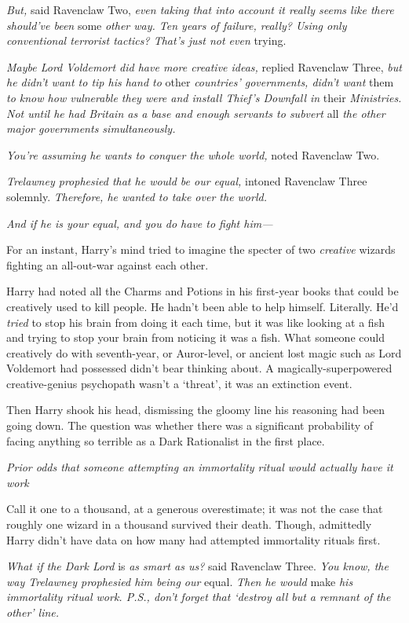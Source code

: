 \emph{But,} said Ravenclaw Two, \emph{even taking that into account{\el} it
really seems like there should've been} some \emph{other way. Ten years of
failure, really? Using only conventional terrorist tactics? That's just{\el}
not even} trying.

\emph{Maybe Lord Voldemort did have more creative ideas,} replied Ravenclaw
Three, \emph{but he didn't want to tip his hand to} other \emph{countries'
governments, didn't want} them \emph{to know how vulnerable they were and
install Thief's Downfall in} their \emph{Ministries. Not until he had Britain
as a base and enough servants to subvert} all \emph{the other major governments
simultaneously.}

\emph{You're assuming he wants to conquer the whole world,} noted Ravenclaw Two.

\emph{Trelawney prophesied that he would be our equal,} intoned Ravenclaw
Three solemnly. \emph{Therefore, he wanted to take over the world.}

\emph{And if he is your equal, and you do have to fight him—}

For an instant, Harry's mind tried to imagine the specter of two
\emph{creative} wizards fighting an all-out-war against each other.

Harry had noted all the Charms and Potions in his first-year books that could
be creatively used to kill people. He hadn't been able to help himself.
Literally. He'd \emph{tried} to stop his brain from doing it each time, but it
was like looking at a fish and trying to stop your brain from noticing it was a
fish. What someone could creatively do with seventh-year, or Auror-level, or
ancient lost magic such as Lord Voldemort had possessed{\el} didn't bear
thinking about. A magically-superpowered creative-genius psychopath wasn't a
`threat', it was an extinction event.

Then Harry shook his head, dismissing the gloomy line his reasoning had been
going down. The question was whether there was a significant probability of
facing anything so terrible as a Dark Rationalist in the first place.

\emph{Prior odds that someone attempting an immortality ritual would actually
have it work{\el}}

Call it one to a thousand, at a generous overestimate; it was not the case that
roughly one wizard in a thousand survived their death. Though, admittedly Harry
didn't have data on how many had attempted immortality rituals first.

\emph{What if the Dark Lord} is \emph{as smart as us?} said Ravenclaw Three.
\emph{You know, the way Trelawney prophesied him being our} equal. \emph{Then
he would} make \emph{his immortality ritual work. P.S., don't forget that
`destroy all but a remnant of the other' line.}

